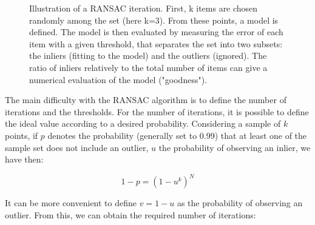 \begin{figure}[H]
\centering%
\caption{Illustration of a RANSAC iteration. \protect{}First, k items are chosen randomly among the set (here k=3). \protect{}From these points, a model is defined. \protect{}The model is then evaluated by measuring the error of each item with a given threshold, that separates the set into two subsets: the inliers (fitting to the model) and the outliers (ignored). The ratio of inliers relatively to the total number of items can give a numerical evaluation of the model ("goodness").}
\end{figure}


The main difficulty with the \gls{RANSAC} algorithm is to define the number of iterations and the thresholds.
For the number of iterations, it is possible to define the ideal value according to a desired probability. Considering a sample of $k$ points, if $p$ denotes the probability (generally set to 0.99) that at least one of the sample set does not include an outlier, $u$ the probability of observing an inlier, we have then:

\[
1-p = (1-u^k)^N
\]

It can be more convenient to define $v=1-u$ as the probability of observing an outlier. From this, we can obtain the required number of iterations:

